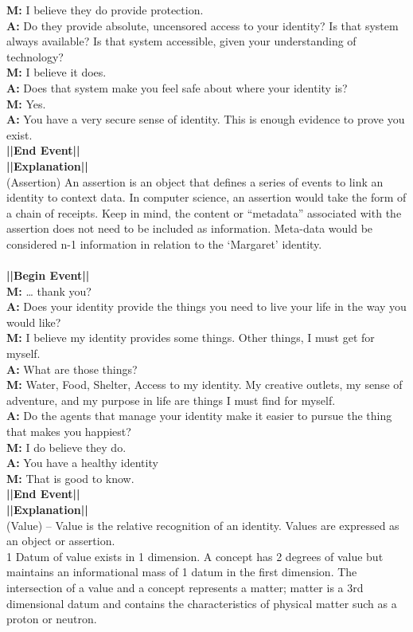 \documentclass{article}
\begin{document}
\textbf{M:} I believe they do provide protection. \\
\textbf{A:} Do they provide absolute, uncensored access to your identity? Is that system always available? Is that system accessible, given your understanding of technology? \\
\textbf{M:} I believe it does. \\
\textbf{A:} Does that system make you feel safe about where your identity is? \\
\textbf{M:} Yes. \\
\textbf{A:} You have a very secure sense of identity.  This is enough evidence to prove you exist. \\
\textbf{||End Event||} \\
\textbf{||Explanation||} \\(Assertion) An assertion is an object that defines a series of events to link an identity to context data.  In computer science, an assertion would take the form of a chain of receipts.  Keep in mind, the content or “metadata” associated with the assertion does not need to be included as information.  Meta-data would be considered n-1 information in relation to the ‘Margaret’ identity.\\\\
\textbf{||Begin Event||} \\
\textbf{M:} … thank you? \\ 
\textbf{A:} Does your identity provide the things you need to live your life in the way you would like? \\
\textbf{M:} I believe my identity provides some things.  Other things, I must get for myself. \\
\textbf{A:} What are those things? \\
\textbf{M:} Water, Food, Shelter, Access to my identity.  My creative outlets, my sense of adventure, and my purpose in life are things I must find for myself. \\ 
\textbf{A:} Do the agents that manage your identity make it easier to pursue the thing that makes you happiest? \\
\textbf{M:} I do believe they do. \\
\textbf{A:} You have a healthy identity \\
\textbf{M:} That is good to know. \\
\textbf{||End Event||} \\
\textbf{||Explanation||} \\ (Value) – Value is the relative recognition of an identity.  Values are expressed as an object or assertion. \\
1 Datum of value exists in 1 dimension. A concept has 2 degrees of value but maintains an informational mass of 1 datum in the first dimension. The intersection of a value and a concept represents a matter; matter is a 3rd dimensional datum and contains the characteristics of physical matter such as a proton or neutron.
\end{document}
